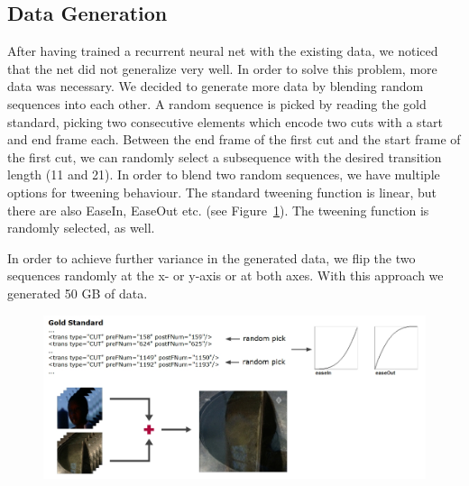 \subsection{Data Generation}
\label{sec:soft_cut_data_generation}

After having trained a recurrent neural net with the existing data, we noticed that the net did not generalize very well.
In order to solve this problem, more data was necessary.
We decided to generate more data by blending random sequences into each other.
A random sequence is picked by reading the gold standard, picking two consecutive elements which encode two cuts with a start and end frame each.
Between the end frame of the first cut and the start frame of the first cut, we can randomly select a subsequence with the desired transition length (11 and 21).
In order to blend two random sequences, we have multiple options for tweening behaviour.
The standard tweening function is linear, but there are also EaseIn, EaseOut etc. (see Figure~\ref{fig:data_generation}).
The tweening function is randomly selected, as well.

In order to achieve further variance in the generated data, we flip the two sequences randomly at the x- or y-axis or at both axes.
With this approach we generated 50 GB of data.


\begin{figure}
    \centering
    \includegraphics[scale=.5]{images/data_generation.jpg}
    \caption{}
    \label{fig:data_generation}
\end{figure}